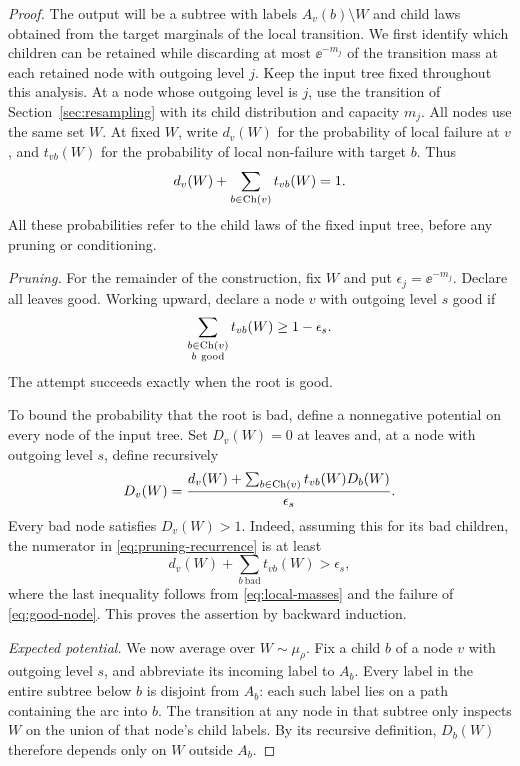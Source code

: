 \begin{proof}
The output will be a subtree with labels $A_v(b)\setminus W$ and
child laws obtained from the target marginals of the local transition.
We first identify which children can be retained while discarding
at most $\ee^{-m_j}$ of the transition mass at each retained node
with outgoing level $j$.
Keep the input tree fixed throughout this analysis. At a node whose
outgoing level is $j$, use the transition of
Section~\ref{sec:resampling} with its child distribution and
capacity $m_j$. All nodes use the same set $W$. At fixed $W$, write
$d_v(W)$ for the probability of local failure at $v$, and
$t_{vb}(W)$ for the probability of local non-failure with target $b$.
Thus
\begin{equation}\label{eq:local-masses}
 d_v(W)+\sum_{b\in\operatorname{Ch}(v)}t_{vb}(W)=1.
\end{equation}
All these probabilities refer to the child laws of the fixed input
tree, before any pruning or conditioning.

\medskip\noindent
\textit{Pruning.}
For the remainder of the construction, fix $W$ and put
$\epsilon_j=\ee^{-m_j}$. Declare all leaves good. Working upward,
declare a node $v$ with outgoing level $s$ good if
\begin{equation}\label{eq:good-node}
 \sum_{\substack{b\in\operatorname{Ch}(v)\\b\ \mathrm{good}}}t_{vb}(W)
 \ge1-\epsilon_s.
\end{equation}
The attempt succeeds exactly when the root is good.

To bound the probability that the root is bad, define a nonnegative
potential on every node of the input tree. Set $D_v(W)=0$ at leaves
and, at a node with outgoing level $s$, define recursively
\begin{equation}\label{eq:pruning-recurrence}
 D_v(W)=\frac{d_v(W)+\sum_{b\in\operatorname{Ch}(v)}t_{vb}(W)D_b(W)}{\epsilon_s}.
\end{equation}
Every bad node satisfies $D_v(W)>1$. Indeed, assuming this for its
bad children, the numerator in \eqref{eq:pruning-recurrence} is at
least
\[
 d_v(W)+\sum_{b\ \mathrm{bad}}t_{vb}(W)>\epsilon_s,
\]
where the last inequality follows from \eqref{eq:local-masses} and
the failure of \eqref{eq:good-node}. This proves the assertion by
backward induction.

\medskip\noindent
\textit{Expected potential.}
We now average over $W\sim\mu_\rho$. Fix a child $b$ of a node $v$
with outgoing level $s$, and abbreviate its incoming label to $A_b$.
Every label in the entire subtree below $b$ is disjoint from $A_b$:
each such label lies on a path containing the arc into $b$.
The transition at any node in that subtree only inspects $W$ on the union
of that node's child labels. By its recursive definition, $D_b(W)$
therefore depends only on $W$ outside $A_b$.


\end{proof}
